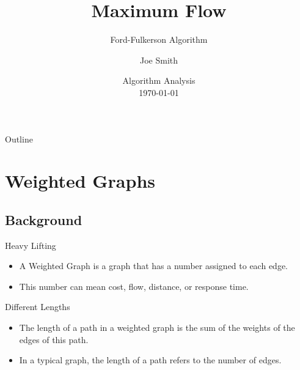 \documentclass{beamer}
\title[] %
{Maximum Flow}
\subtitle
{Ford-Fulkerson Algorithm} %
\author{Joe Smith} %
\institute[] %
{
  Department of Computer Science\\
  Chapman University}
\date[] %
{Algorithm Analysis\\ \today}
\begin{document}
\begin{frame}
  \titlepage
\end{frame}

\begin{frame}{Outline}
  \tableofcontents
\end{frame}




\section{Weighted Graphs}

\subsection{Background}

\begin{frame}{Heavy Lifting}

  \begin{itemize}
  \item
    A \alert{Weighted Graph} is a graph that has a number assigned to each edge.
  \item
    This number can mean cost, flow, distance, or response time.
  \end{itemize}
\end{frame}

\begin{frame}{Different Lengths}

  \begin{itemize}
  \item
	The \alert{length} of a path in a weighted graph is the sum of the weights of the edges of this path.
  \item 
	In a typical graph, the \alert{length} of a path refers to the number of edges.
  \end{itemize}
\end{frame}
\end{document}
